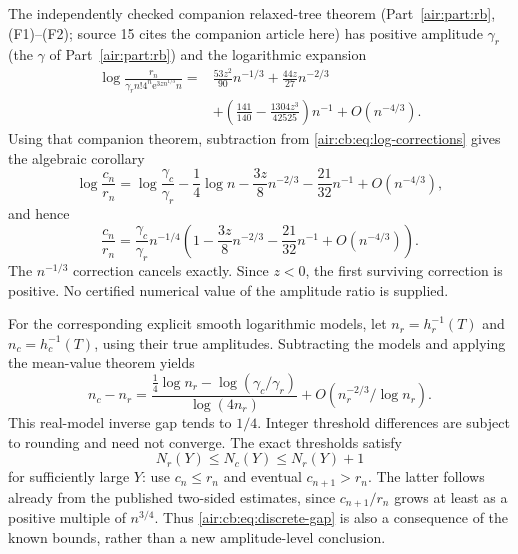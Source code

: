 \documentclass[11pt,letterpaper]{article}
\numberwithin{equation}{section}
\theoremstyle{remark}
\newcommand{\ee}{\mathrm e}
\begin{document}
The independently checked companion relaxed-tree theorem (Part~\ref{air:part:rb}, (F1)--(F2); source 15 cites the companion article here)
has positive amplitude $\gamma_r$ (the $\gamma$ of Part~\ref{air:part:rb}) and the logarithmic expansion
\begin{equation}\label{air:cb:eq:relaxed-log}
\begin{aligned}
\log\frac{r_n}{\gamma_r n!4^n\ee^{3zn^{1/3}}n}
={}&\frac{53z^2}{90}n^{-1/3}+\frac{44z}{27}n^{-2/3}\\
&+\left(\frac{141}{140}-\frac{1304z^3}{42525}\right)n^{-1}
+O(n^{-4/3}).
\end{aligned}
\end{equation}
Using that companion theorem, subtraction from
\eqref{air:cb:eq:log-corrections} gives the algebraic corollary
\begin{equation}\label{air:cb:eq:ratio-log}
\log\frac{c_n}{r_n}=\log\frac{\gamma_c}{\gamma_r}-\frac14\log n
-\frac{3z}{8}n^{-2/3}-\frac{21}{32}n^{-1}+O(n^{-4/3}),
\end{equation}
and hence
\begin{equation}\label{air:cb:eq:ratio-relative}
\frac{c_n}{r_n}=\frac{\gamma_c}{\gamma_r}n^{-1/4}
\left(1-\frac{3z}{8}n^{-2/3}-\frac{21}{32}n^{-1}+O(n^{-4/3})\right).
\end{equation}
The $n^{-1/3}$ correction cancels exactly. Since $z<0$, the first surviving
correction is positive. No certified numerical value of the amplitude ratio
is supplied.

For the corresponding explicit smooth logarithmic models, let
$n_r=h_r^{-1}(T)$ and $n_c=h_c^{-1}(T)$, using their true amplitudes.
Subtracting the models and applying the mean-value theorem yields
\begin{equation}\label{air:cb:eq:model-gap}
n_c-n_r=\frac{\tfrac14\log n_r-\log(\gamma_c/\gamma_r)}{\log(4n_r)}
+O(n_r^{-2/3}/\log n_r).
\end{equation}
This real-model inverse gap tends to $1/4$. Integer threshold differences
are subject to rounding and need not converge. The exact thresholds satisfy
\begin{equation}\label{air:cb:eq:discrete-gap}
N_r(Y)\le N_c(Y)\le N_r(Y)+1
\end{equation}
for sufficiently large $Y$: use $c_n\le r_n$ and eventual
$c_{n+1}>r_n$. The latter follows already from the published two-sided
estimates, since $c_{n+1}/r_n$ grows at least as a positive multiple of
$n^{3/4}$. Thus \eqref{air:cb:eq:discrete-gap} is also a consequence of the known
bounds, rather than a new amplitude-level conclusion.
\end{document}
